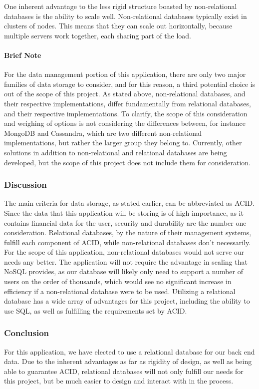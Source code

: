 \documentclass[onecolumn, draftclsnofoot,10pt, compsoc]{IEEEtran}
\begin{document}
One inherent advantage to the less rigid structure boasted by non-relational databases is the ability to scale well. Non-relational databases typically exist in clusters of nodes. This means that they can scale out horizontally, because multiple servers work together, each sharing part of the load. 

 
\paragraph{Brief Note}
For the data management portion of this application, there are only two major families of data storage to consider, and for this reason, a third potential choice is out of the scope of this project. As stated above, non-relational databases, and their respective implementations, differ fundamentally from relational databases, and their respective implementations. To clarify, the scope of this consideration and weighing of options is not considering the differences between, for instance MongoDB and Cassandra, which are two different non-relational implementations, but rather the larger group they belong to. Currently, other solutions in addition to non-relational and relational databases are being developed, but the scope of this project does not include them for consideration.

\subsubsection{Discussion}
The main criteria for data storage, as stated earlier, can be abbreviated as ACID. Since the data that this application will be storing is of high importance, as it contains financial data for the user, security and durability are the number one consideration. Relational databases, by the nature of their management systems, fulfill each component of ACID, while non-relational databases don't necessarily.  For the scope of this application, non-relational databases would not serve our needs any better. The application will not require the advantage in scaling that NoSQL provides, as our database will likely only need to support a number of users on the order of thousands, which would see no significant increase in efficiency if a non-relational database were to be used. Utilizing a relational database has a wide array of advantages for this project, including the ability to use SQL, as well as fulfilling the requirements set by ACID.


\subsubsection{Conclusion}
For this application, we have elected to use a relational database for our back end data. Due to the inherent advantages as far as rigidity of design, as well as being able to guarantee ACID, relational databases will not only fulfill our needs for this project, but be much easier to design and interact with in the process. 
\end{document}
